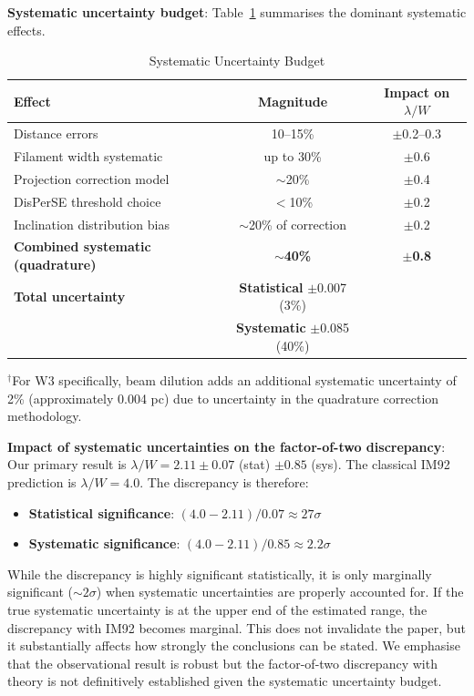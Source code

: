 \documentclass[11pt,a4paper]{article}
\begin{document}
\textbf{Systematic uncertainty budget}: Table~\ref{tab:uncertainties} summarises the dominant systematic effects.

\begin{table}[H]
\centering
\caption{Systematic Uncertainty Budget}
\label{tab:uncertainties}
\begin{tabular}{lcc}
\toprule
Effect & Magnitude & Impact on $\lambda/W$ \\
\midrule
Distance errors & 10--15\% & $\pm$0.2--0.3 \\
Filament width systematic & up to 30\% & $\pm$0.6 \\
Projection correction model & $\sim$20\% & $\pm$0.4 \\
DisPerSE threshold choice & $<$10\% & $\pm$0.2 \\
Inclination distribution bias & $\sim$20\% of correction & $\pm$0.2 \\
\textbf{Combined systematic (quadrature)} & \textbf{$\sim$40\%} & \textbf{$\pm$0.8} \\
\midrule
\textbf{Total uncertainty} & \textbf{Statistical} $\pm$0.007 (3\%) & \\
& \textbf{Systematic} $\pm$0.085 (40\%) & \\
\bottomrule
\end{tabular}
\vspace{-0.5em}
\small{$^{\dagger}$For W3 specifically, beam dilution adds an additional systematic uncertainty of 2\% (approximately 0.004 pc) due to uncertainty in the quadrature correction methodology.}
\end{table}

\textbf{Impact of systematic uncertainties on the factor-of-two discrepancy}: Our primary result is $\lambda/W = 2.11 \pm 0.07$ (stat) $\pm 0.85$ (sys). The classical IM92 prediction is $\lambda/W = 4.0$. The discrepancy is therefore:
\begin{itemize}
    \item \textbf{Statistical significance}: $(4.0 - 2.11) / 0.07 \approx 27\sigma$
    \item \textbf{Systematic significance}: $(4.0 - 2.11) / 0.85 \approx 2.2\sigma$
\end{itemize}
While the discrepancy is highly significant statistically, it is only marginally significant ($\sim2\sigma$) when systematic uncertainties are properly accounted for. If the true systematic uncertainty is at the upper end of the estimated range, the discrepancy with IM92 becomes marginal. This does not invalidate the paper, but it substantially affects how strongly the conclusions can be stated. We emphasise that the observational result is robust but the factor-of-two discrepancy with theory is not definitively established given the systematic uncertainty budget.
\end{document}
